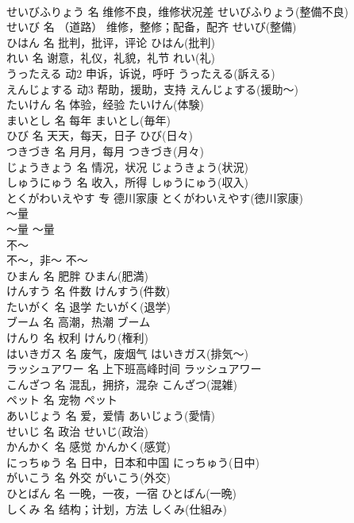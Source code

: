 \documentclass[8pt]{extreport}
\begin{document}
\begin{CJK}{UTF8}{min}
\\	せいびふりょう	名	维修不良，维修状况差	せいびふりょう(整備不良)	
\\	せいび	名	（道路） 维修，整修；配备，配齐	せいび(整備)	
\\	ひはん	名	批判，批评，评论	ひはん(批判)	
\\	れい	名	谢意，礼仪，礼貌，礼节	れい(礼)	
\\	うったえる	动2	申诉，诉说，呼吁	うったえる(訴える)	
\\	えんじょする	动3	帮助，援助，支持	えんじょする(援助～)	
\\	たいけん	名	体验，经验	たいけん(体験)	
\\	まいとし	名	每年	まいとし(毎年)	
\\	ひび	名	天天，每天，日子	ひび(日々)	
\\	つきづき	名	月月，每月	つきづき(月々)	
\\	じょうきょう	名	情况，状况	じょうきょう(状況)	
\\	しゅうにゅう	名	收入，所得	しゅうにゅう(収入)	
\\	とくがわいえやす	专	德川家康	とくがわいえやす(徳川家康)	
\\	～量	
\\	～量	～量	
\\	不～	
\\	不～，非～	不～	
\\	ひまん	名	肥胖	ひまん(肥満)	
\\	けんすう	名	件数	けんすう(件数)	
\\	たいがく	名	退学	たいがく(退学)	
\\	ブーム	名	高潮，热潮	ブーム	
\\	けんり	名	权利	けんり(権利)	
\\	はいきガス	名	废气，废烟气	はいきガス(排気～)	
\\	ラッシュアワー	名	上下班高峰时间	ラッシュアワー	
\\	こんざつ	名	混乱，拥挤，混杂	こんざつ(混雑)	
\\	ペット	名	宠物	ペット	
\\	あいじょう	名	爱，爱情	あいじょう(愛情)	
\\	せいじ	名	政治	せいじ(政治)	
\\	かんかく	名	感觉	かんかく(感覚)	
\\	にっちゅう	名	日中，日本和中国	にっちゅう(日中)	
\\	がいこう	名	外交	がいこう(外交)	
\\	ひとばん	名	一晚，一夜，一宿	ひとばん(一晩)	
\\	しくみ	名	结构；计划，方法	しくみ(仕組み)	

\end{CJK}
\end{document}
